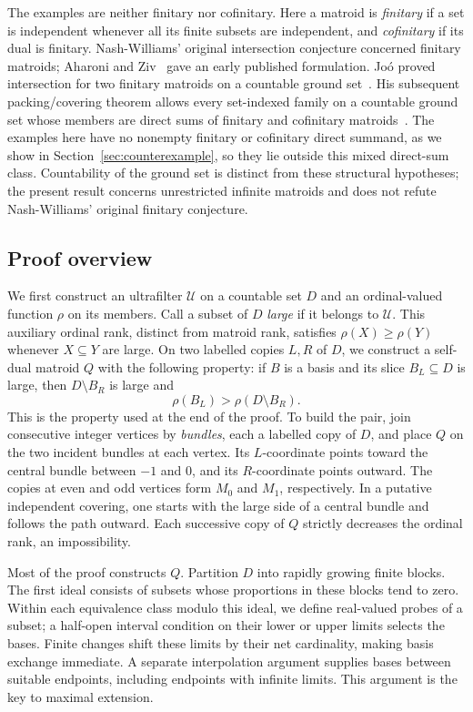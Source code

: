 The examples are neither finitary nor cofinitary. Here a matroid is
\emph{finitary} if a set is independent whenever all its finite subsets
are independent, and \emph{cofinitary} if its dual is finitary. Nash-Williams' original intersection conjecture concerned finitary
matroids; Aharoni and Ziv~\cite{AharoniZiv1998} gave an early published
formulation. Jo\'o proved intersection for two finitary matroids on a countable
ground set~\cite[Theorem~1.3]{Joo2021Countable}.
His subsequent packing/covering theorem allows every set-indexed family
on a countable ground set whose members are direct sums of finitary and
cofinitary matroids~\cite[Theorem~1.2]{Joo2024Packing}.
The examples here have no nonempty finitary or cofinitary direct summand,
as we show in Section~\ref{sec:counterexample}, so they lie outside this
mixed direct-sum class. Countability of the ground set is distinct from
these structural hypotheses; the present result concerns unrestricted
infinite matroids and does not refute Nash-Williams' original finitary
conjecture.

\subsection*{Proof overview}

We first construct an ultrafilter $\mathcal U$ on a countable set $D$ and
an ordinal-valued function $\rho$ on its members. Call a subset of $D$
\emph{large} if it belongs to $\mathcal U$. This auxiliary ordinal rank, distinct from matroid rank, satisfies
$\rho(X)\ge\rho(Y)$ whenever $X\subseteq Y$ are large. On two labelled copies $L,R$ of $D$, we construct
a self-dual matroid $Q$ with the following property: if $B$ is a basis
and its slice $B_L\subseteq D$ is large, then $D\setminus B_R$ is large
and
\[
 \rho(B_L)>\rho(D\setminus B_R).
\]
This is the property used at the end of the proof. To build the pair,
join consecutive integer vertices by \emph{bundles}, each a labelled
copy of $D$, and place $Q$ on the two incident bundles at each vertex.
Its $L$-coordinate points toward the central bundle between $-1$ and $0$,
and its $R$-coordinate points outward. The copies at even and odd vertices
form $M_0$ and $M_1$, respectively. In a putative independent covering, one starts with the large side of a
central bundle and follows the path outward. Each successive copy of
$Q$ strictly decreases the ordinal rank, an impossibility.

Most of the proof constructs $Q$. Partition $D$ into rapidly growing
finite blocks. The first ideal consists of subsets whose proportions
in these blocks tend to zero. Within each equivalence class modulo this
ideal, we define real-valued probes of a subset; a half-open interval
condition on their lower or upper limits selects the bases. Finite
changes shift these limits by their net cardinality, making basis
exchange immediate. A separate interpolation argument supplies bases
between suitable endpoints, including endpoints with infinite limits.
This argument is the key to maximal extension.

